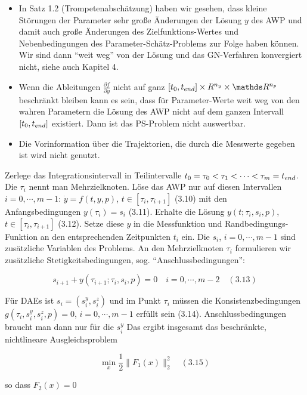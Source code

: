 \begin{itemize}
\item In Satz 1.2 (Trompetenabschätzung) haben wir gesehen, dass kleine Störungen der Parameter sehr große Änderungen der Lösung $y$ des AWP und damit auch große Änderungen des Zielfunktions-Wertes und Nebenbedingungen des Parameter-Schätz-Problems zur Folge haben können. Wir sind dann "`weit weg"' von der Lösung und das GN-Verfahren konvergiert nicht, siehe auch Kapitel 4.
\item Wenn die Ableitungen $\tfrac{\partial f}{\partial y}$ nicht auf ganz $[t_0,\tend]\times R^{n_y} \times \R^{n_p}$  beschränkt bleiben kann es sein, dass für Parameter-Werte weit weg von den wahren Parametern die Lösung des AWP nicht auf dem ganzen Intervall $[t_0,t_{end}]$ existiert. Dann  ist das PS-Problem nicht auswertbar.
\item Die Vorinformation über die Trajektorien, die durch die Messwerte gegeben ist wird nicht genutzt.
\end{itemize}


Zerlege das Integrationsintervall in Teilintervalle $t_0 = \tau_0 < \tau_1 < \cdots < \tau_m = t_{end}$. Die $\tau_i$ nennt man Mehrzielknoten. Löse das AWP nur auf diesen Intervallen $i=0,\cdots,m-1$: $\dot y = f(t,y,p)$, $t \in [\tau_i, \tau_{i+1} ]$ (3.10) mit den Anfangsbedingungen $y(\tau_i) = s_i$ (3.11). Erhalte die Lösung $y(t; \tau_i, s_i,p)$, $t\in[\tau_i, \tau_{i+1}]$ (3.12). Setze diese $y$ in die Messfunktion und Randbedingungs-Funktion an den entsprechenden Zeitpunkten $t_i$ ein. Die $s_i$, $i=0,\cdots,m-1$ sind zusätzliche Variablen des Problems. An den Mehrzielknoten $\tau_i$ formulieren wir zusätzliche  Stetigkeitsbedingungen, sog. "`Anschlussbedingungen"':

\[ s_{i+1} + y(\tau_{i+1}; \tau_i, s_i, p) = 0 \quad i=0,\cdots,m-2 \quad (3.13)\]

Für DAEs ist $s_i = (s_i^y, s_i^z)$ und im Punkt $\tau_i$ müssen die Konsistenzbedingungen $g(\tau_i, s_i^y, s_i^z, p) = 0$, $i=0,\cdots,m-1$ erfüllt sein (3.14). Anschlussbedingungen braucht man dann nur für die $s_i^y$ Das ergibt insgesamt das beschränkte, nichtlineare Ausgleichsproblem

\[ \min_x \frac  12 \|F_1(x)\|_2^2 \quad (3.15) \]

so dass $F_2(x) = 0$

